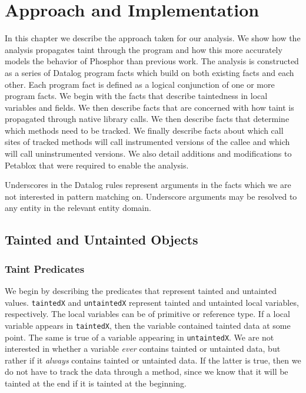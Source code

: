 \chapter{Approach and Implementation}
In this chapter we describe the approach taken for our analysis. We
show how the analysis propagates taint through the program and how
this more accurately models the behavior of Phosphor than previous
work. The analysis is constructed as a series of Datalog program facts
which build on both existing facts and each other. Each program fact
is defined as a logical conjunction of one or more program facts. We
begin with the facts that describe taintedness in local variables and
fields. We then describe facts that are concerned with how taint is
propagated through native library calls. We then describe facts that
determine which methods need to be tracked. We finally describe facts
about which call sites of tracked methods will call instrumented
versions of the callee and which will call uninstrumented versions. We
also detail additions and modifications to Petablox that were required
to enable the analysis.

Underscores in the Datalog rules represent arguments in the facts
which we are not interested in pattern matching on. Underscore
arguments may be resolved to any entity in the relevant entity domain.
\section{Tainted and Untainted Objects}
\subsection{Taint Predicates}
We begin by describing the predicates that represent tainted and
untainted values. \texttt{taintedX} and \texttt{untaintedX} represent
tainted and untainted local variables, respectively. The local
variables can be of primitive or reference type. If a local variable
appears in \texttt{taintedX}, then the variable contained tainted data
at some point. The same is true of a variable appearing in
\texttt{untaintedX}. We are not interested in whether a variable
\textit{ever} contains tainted or untainted data, but rather if it
\textit{always} contains tainted or untainted data. If the latter is
true, then we do not have to track the data through a method, since we
know that it will be tainted at the end if it is tainted at the
beginning.

